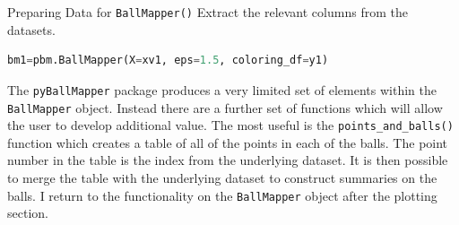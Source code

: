 \documentclass{article}
\begin{document}
\begin{mybox}[label=box:pybm1]{Preparing Data for \texttt{BallMapper()}}
	Extract the relevant columns from the datasets. 
	\begin{lstlisting}[language=Python]
		bm1=pbm.BallMapper(X=xv1, eps=1.5, coloring_df=y1)
	\end{lstlisting}
\end{mybox}


The \texttt{pyBallMapper} package produces a very limited set of elements within the \texttt{BallMapper} object. Instead there are a further set of functions which will allow the user to develop additional value. The most useful is the \texttt{points\_and\_balls()} function which creates a table of all of the points in each of the balls. The point number in the table is the index from the underlying dataset. It is then possible to merge the table with the underlying dataset to construct summaries on the balls. I return to the functionality on the \texttt{BallMapper} object after the plotting section.
\end{document}
